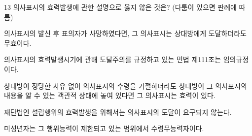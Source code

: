 \begin{question}{13}
의사표시의 효력발생에 관한 설명으로 옳지 않은 것은? (다툼이 있으면 판례에 따름)
\begin{choices}
  \item 의사표시의 발신 후 표의자가 사망하였다면, 그 의사표시는 상대방에게 도달하더라도 무효이다.
  \item 의사표시의 효력발생시기에 관해 도달주의를 규정하고 있는 민법 제111조는 임의규정이다.
  \item 상대방이 정당한 사유 없이 의사표시의 수령을 거절하더라도 상대방이 그 의사표시의 내용을 알 수 있는 객관적 상태에 놓여 있다면 그 의사표시는 효력이 있다.
  \item 재단법인 설립행위의 효력발생을 위해서는 의사표시의 도달이 요구되지 않는다.
  \item 미성년자는 그 행위능력이 제한되고 있는 범위에서 수령무능력자이다.
\end{choices}
\end{question}
